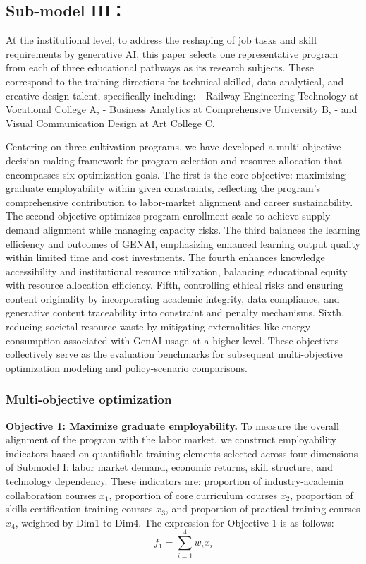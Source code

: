 \documentclass{mcmthesis}
\begin{document}
\subsection{Sub-model III：}

At the institutional level, to address the reshaping of job tasks and skill requirements by generative AI, this paper selects one representative program from each of three educational pathways as its research subjects. These correspond to the training directions for technical-skilled, data-analytical, and creative-design talent, specifically including: - Railway Engineering Technology at Vocational College A, - Business Analytics at Comprehensive University B, - and Visual Communication Design at Art College C.


Centering on three cultivation programs, we have developed a multi-objective decision-making framework for program selection and resource allocation that encompasses six optimization goals. The first is the core objective: maximizing graduate employability within given constraints, reflecting the program's comprehensive contribution to labor-market alignment and career sustainability. The second objective optimizes program enrollment scale to achieve supply-demand alignment while managing capacity risks. The third balances the learning efficiency and outcomes of GENAI, emphasizing enhanced learning output quality within limited time and cost investments. The fourth enhances knowledge accessibility and institutional resource utilization, balancing educational equity with resource allocation efficiency. Fifth, controlling ethical risks and ensuring content originality by incorporating academic integrity, data compliance, and generative content traceability into constraint and penalty mechanisms. Sixth, reducing societal resource waste by mitigating externalities like energy consumption associated with GenAI usage at a higher level. These objectives collectively serve as the evaluation benchmarks for subsequent multi-objective optimization modeling and policy-scenario comparisons.

\subsubsection{Multi-objective optimization}
\noindent\textbf{Objective 1: Maximize graduate employability.}
To measure the overall alignment of the program with the labor market, we construct employability indicators based on quantifiable training elements selected across four dimensions of Submodel I: labor market demand, economic returns, skill structure, and technology dependency. These indicators are: proportion of industry-academia collaboration courses $x_1$, proportion of core curriculum courses $x_2$, proportion of skills certification training courses $x_3$, and proportion of practical training courses $x_4$, weighted by Dim1 to Dim4. The expression for Objective 1 is as follows:
\begin{equation}
f_1=\sum_{i=1}^{4} w_i x_i 
\end{equation}
\end{document}
